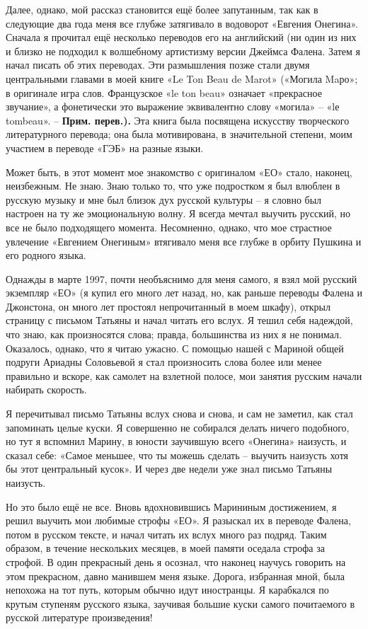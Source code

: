 \documentclass[../main.tex]{subfiles}
\begin{document}
Далее, однако, мой рассказ становится ещё более запутанным, так как в следующие два года меня все глубже затягивало в водоворот «Евгения Онегина».
Сначала я прочитал ещё несколько переводов его на английский (ни один из них и близко не подходил к волшебному артистизму версии Джеймса Фалена.
Затем я начал писать об этих переводах.
Эти размышления позже стали двумя центральными главами в моей книге «Le Ton Beau de Marot» («Могила Maро»; в оригинале игра слов.
Французское «le ton beau» означает «прекрасное звучание», а фонетически это выражение эквивалентно слову «могила» \--- «lе tombeau». \--- \textbf{Прим.
перев.).} Эта книга была посвящена искусству творческого литературного перевода; она была мотивирована, в значительной степени, моим участием в переводе «ГЭБ» на разные языки.

Может быть, в этот момент мое знакомство с оригиналом «ЕО» стало, наконец, неизбежным.
Не знаю.
Знаю только то, что уже подростком я был влюблен в русскую музыку и мне был близок дух русской культуры \--- я словно был настроен на ту же эмоциональную волну.
Я всегда мечтал выучить русский, но все не было подходящего момента.
Несомненно, однако, что мое страстное увлечение «Евгением Онегиным» втягивало меня все глубже в орбиту Пушкина и его родного языка.

Однажды в марте 1997, почти необъяснимо для меня самого, я взял мой русский экземпляр «ЕО» (я купил его много лет назад, но, как раньше переводы Фалена и Джонстона, он много лет простоял непрочитанный в моем шкафу), открыл страницу с письмом Татьяны и начал читать его вслух.
Я тешил себя надеждой, что знаю, как произносятся слова; правда, большинства из них я не понимал.
Оказалось, однако, что я читаю ужасно.
С помощью нашей с Мариной общей подруги Ариадны Соловьевой я стал произносить слова более или менее правильно и вскоре, как самолет на взлетной полосе, мои занятия русским начали набирать скорость.

Я перечитывал письмо Татьяны вслух снова и снова, и сам не заметил, как стал запоминать целые куски.
Я совершенно не собирался делать ничего подобного, но тут я вспомнил Марину, в юности заучившую всего «Онегина» наизусть, и сказал себе: «Самое меньшее, что ты можешь сделать \--- выучить наизусть хотя бы этот центральный кусок».
И через две недели уже знал письмо Татьяны наизусть.

Но это было ещё не все.
Вновь вдохновившись Марининым достижением, я решил выучить мои любимые строфы «ЕО».
Я разыскал их в переводе Фалена, потом в русском тексте, и начал читать их вслух много раз подряд.
Таким образом, в течение нескольких месяцев, в моей памяти оседала строфа за строфой.
В один прекрасный день я осознал, что наконец научусь говорить на этом прекрасном, давно манившем меня языке.
Дорога, избранная мной, была непохожа на тот путь, которым обычно идут иностранцы.
Я карабкался по крутым ступеням русского языка, заучивая большие куски самого почитаемого в русской литературе произведения!
\end{document}
